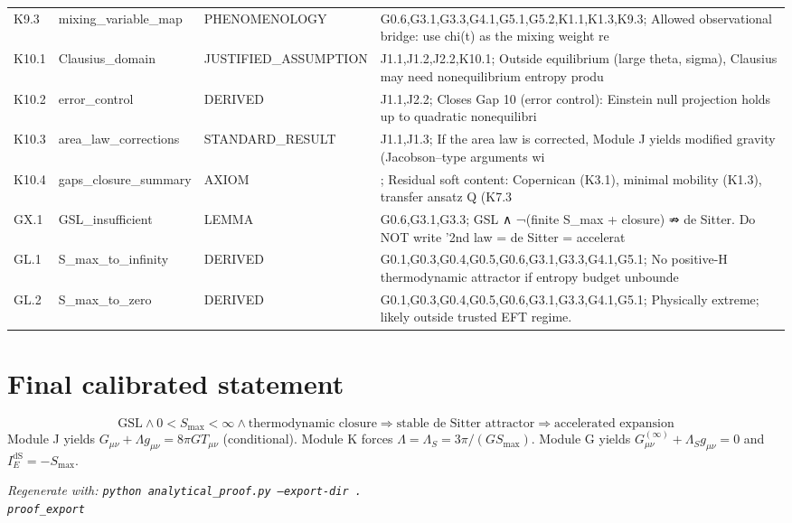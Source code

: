 \documentclass[11pt,a4paper]{article}
\theoremstyle{remark}\newtheorem*{caution}{Caution}
\begin{document}
{\begin{longtable}{@{}p{2.1cm}p{3.1cm}p{2.6cm}p{6cm}@{}}
K9.3 & mixing\_variable\_map & PHENOMENOLOGY & G0.6,G3.1,G3.3,G4.1,G5.1,G5.2,K1.1,K1.3,K9.3; Allowed observational bridge: use chi(t) as the mixing weight re \\
K10.1 & Clausius\_domain & JUSTIFIED\_ASSUMPTION & J1.1,J1.2,J2.2,K10.1; Outside equilibrium (large theta, sigma), Clausius may need nonequilibrium entropy produ \\
K10.2 & error\_control & DERIVED & J1.1,J2.2; Closes Gap 10 (error control): Einstein null projection holds up to quadratic nonequilibri \\
K10.3 & area\_law\_corrections & STANDARD\_RESULT & J1.1,J1.3; If the area law is corrected, Module J yields modified gravity (Jacobson–type arguments wi \\
K10.4 & gaps\_closure\_summary & AXIOM & ; Residual soft content: Copernican (K3.1), minimal mobility (K1.3), transfer ansatz Q (K7.3 \\
GX.1 & GSL\_insufficient & LEMMA & G0.6,G3.1,G3.3; GSL ∧ ¬(finite S\_max + closure) ⇏ de Sitter. Do NOT write '2nd law = de Sitter = accelerat \\
GL.1 & S\_max\_to\_infinity & DERIVED & G0.1,G0.3,G0.4,G0.5,G0.6,G3.1,G3.3,G4.1,G5.1; No positive-H thermodynamic attractor if entropy budget unbounde \\
GL.2 & S\_max\_to\_zero & DERIVED & G0.1,G0.3,G0.4,G0.5,G0.6,G3.1,G3.3,G4.1,G5.1; Physically extreme; likely outside trusted EFT regime. \\
\bottomrule\end{longtable}}
\section{Final calibrated statement}
\begin{equation*}
\boxed{
\mathrm{GSL}\wedge 0<S_{\max}<\infty\wedge\text{thermodynamic closure}
\Longrightarrow\text{stable de Sitter attractor}
\Longrightarrow\text{accelerated expansion}
}
\end{equation*}
Module J yields $G_{\mu\nu}+\Lambda g_{\mu\nu}=8\pi G T_{\mu\nu}$ (conditional). Module K forces $\Lambda=\Lambda_S=3\pi/(G S_{\max})$. Module G yields $G_{\mu\nu}^{(\infty)}+\Lambda_S g_{\mu\nu}=0$ and $I_E^{\mathrm{dS}}=-S_{\max}$.
\par\vspace{1em}\noindent\textit{Regenerate with: \texttt{python analytical\_proof.py --export-dir .\\proof\_export}}
\end{document}
